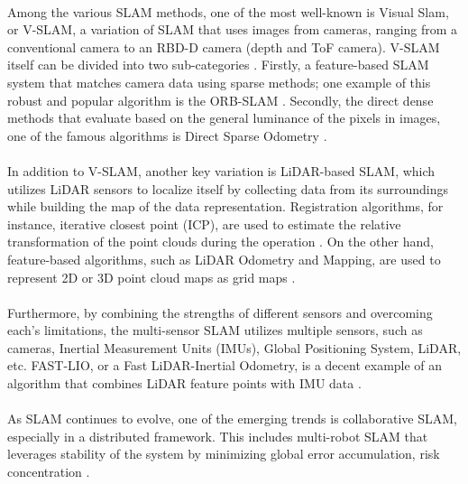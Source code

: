 \paragraph*{}
Among the various SLAM methods, one of the most well-known is Visual Slam, or V-SLAM, a variation of SLAM that uses images from cameras, ranging from a conventional camera to an RBD-D camera (depth and ToF camera). V-SLAM itself can be divided into two sub-categories \cite{benkis2024survey}. Firstly, a feature-based SLAM system that matches camera data using sparse methods; one example of this robust and popular algorithm is the ORB-SLAM \cite{mur2015orb}. Secondly, the direct dense methods that evaluate based on the general luminance of the pixels in images, one of the famous algorithms is Direct Sparse Odometry \cite{engel2018direct}.

\paragraph*{}
In addition to V-SLAM, another key variation is LiDAR-based SLAM, which utilizes LiDAR sensors to localize itself by collecting data from its surroundings while building the map of the data representation. Registration algorithms, for instance, iterative closest point (ICP), are used to estimate the relative transformation of the point clouds during the operation \cite{gu2020review}. On the other hand, feature-based algorithms, such as LiDAR Odometry and Mapping, are used to represent 2D or 3D point cloud maps as grid maps \cite{zhang2014loam}. 

\paragraph*{}
Furthermore, by combining the strengths of different sensors and overcoming each’s limitations, the multi-sensor SLAM utilizes multiple sensors, such as cameras, Inertial Measurement Units (IMUs), Global Positioning System, LiDAR, etc. FAST-LIO, or a Fast LiDAR-Inertial Odometry, is a decent example of an algorithm that combines LiDAR feature points with IMU data \cite{xu2021fast}.

\paragraph*{}
As SLAM continues to evolve, one of the emerging trends is collaborative SLAM, especially in a distributed framework. This includes multi-robot SLAM that leverages stability of the system by minimizing global error accumulation, risk concentration \cite{chen2023overview}. 

